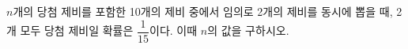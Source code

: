 $n$개의 당첨 제비를 포함한 10개의 제비 중에서 임의로 2개의 제비를 동시에 뽑을 때, 2개 모두 당첨 제비일 확률은 $\dfrac{1}{15}$이다. 이때 $n$의 값을 구하시오. 
